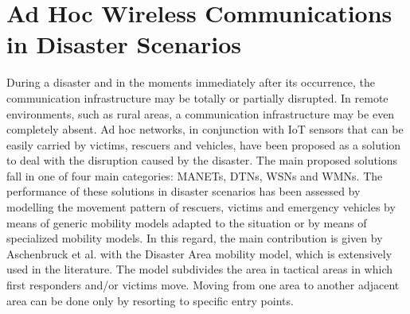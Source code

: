 \section{Ad Hoc Wireless Communications in Disaster Scenarios}

During a disaster and in the moments immediately after its occurrence, the communication infrastructure may be totally or partially disrupted. In remote environments, such as rural areas, a communication infrastructure may be even completely absent. Ad hoc networks, in conjunction with \gls{IoT} sensors that can be easily carried by victims, rescuers and vehicles, have been proposed as a solution to deal with the disruption caused by the disaster. The main proposed solutions fall in one of four main categories: \glspl{MANET}, \glspl{DTN}, \glspl{WSN} and \glspl{WMN}. The performance of these solutions in disaster scenarios has been assessed by modelling the movement pattern of rescuers, victims and emergency vehicles by means of generic mobility models adapted to the situation or by means of specialized mobility models. In this regard, the main contribution is given by Aschenbruck et al. \cite{ref:soa-mobmodel1} with the Disaster Area mobility model, which is extensively used in the literature. The model subdivides the area in tactical areas in which first responders and/or victims move. Moving from one area to another adjacent area can be done only by resorting to specific entry points.   \\

